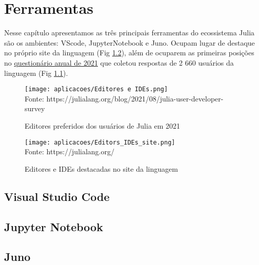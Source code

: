 %

\chapter{Ferramentas}
Nesse capítulo apresentamos as três principais ferramentas do ecossistema Julia são os ambientes: VScode, JupyterNotebook e Juno. 
Ocupam lugar de destaque no próprio site da linguagem (Fig \ref{julia_editors_site}), além de ocuparem as primeiras posições no \href{https://julialang.org/blog/2021/08/julia-user-developer-survey/}{questionário anual de 2021} que coletou respostas de 2 660 usuários da linguagem (Fig \ref{julia_editors_survey}). 

   \begin{figure}[H]
    \begin{center}
        \caption{Editores preferidos dos usuários de Julia em 2021} \label{julia_editors_survey}
        \texttt{[image: aplicacoes/Editores e IDEs.png]} \\
        {\tiny \sf Fonte: https://julialang.org/blog/2021/08/julia-user-developer-survey }
    \end{center}
   \end{figure} 

   \begin{figure}[H]
    \begin{center}
        \caption{Editores e IDEs destacadas no site da linguagem} \label{julia_editors_site}
        \texttt{[image: aplicacoes/Editors\_IDEs\_site.png]} \\
        {\tiny \sf Fonte: https://julialang.org/}
    \end{center}
   \end{figure} 

\section{Visual Studio Code}

\section{Jupyter Notebook}

\section{Juno}
